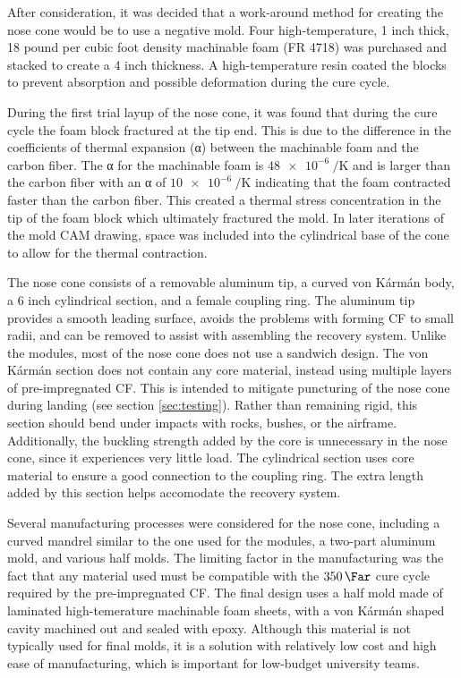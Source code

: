 \documentclass{aiaa-tc}%
\begin{document}
After consideration, it was decided that a work-around method for creating the nose cone would be to use a negative mold. Four high-temperature, 1 inch thick, 18 pound per cubic foot density machinable foam (FR 4718) was purchased and stacked to create a 4 inch thickness. A high-temperature resin coated the blocks to prevent absorption and possible deformation during the cure cycle.

During the first trial layup of the nose cone, it was found that during the cure cycle the foam block fractured at the tip end. This is due to the difference in the coefficients of thermal expansion (α) between the machinable foam and the carbon fiber. The α for the machinable foam is $\SI{48e-6}{\per\kelvin}$ and is larger than the carbon fiber with an α of $\SI{10e-6}{\per\kelvin}$ indicating that the foam contracted faster than the carbon fiber. This created a thermal stress concentration in the tip of the foam block which ultimately fractured the mold. In later iterations of the mold CAM drawing, space was included into the cylindrical base of the cone to allow for the thermal contraction.
%

The nose cone consists of a removable aluminum tip, a curved von K\'arm\'an body, a 6 inch cylindrical section, and a female coupling ring. 
The aluminum tip provides a smooth leading surface, avoids the problems with forming CF to small radii, and can be removed to assist with assembling the recovery system. 
Unlike the modules, most of the nose cone does not use a sandwich design.
The von K\'arm\'an section does not contain any core material, instead using multiple layers of pre-impregnated CF. 
This is intended to mitigate puncturing of the nose cone during landing (see section \ref{sec:testing}). 
Rather than remaining rigid, this section should bend under impacts with rocks, bushes, or the airframe. 
Additionally, the buckling strength added by the core is unnecessary in the nose cone, since it experiences very little load.
The cylindrical section uses core material to ensure a good connection to the coupling ring. 
The extra length added by this section helps accomodate the recovery system. 

Several manufacturing processes were considered for the nose cone, including a curved mandrel similar to the one used for the modules, a two-part aluminum mold, and various half molds. 
The limiting factor in the manufacturing was the fact that any material used must be compatible with the $\SI{350}{\Far}$ cure cycle required by the pre-impregnated CF. 
The final design uses a half mold made of laminated high-temerature machinable foam sheets, with a von K\'arm\'an shaped cavity machined out and sealed with epoxy. 
Although this material is not typically used for final molds, it is a solution with relatively low cost and high ease of manufacturing, which is important for low-budget university teams.
\end{document}

